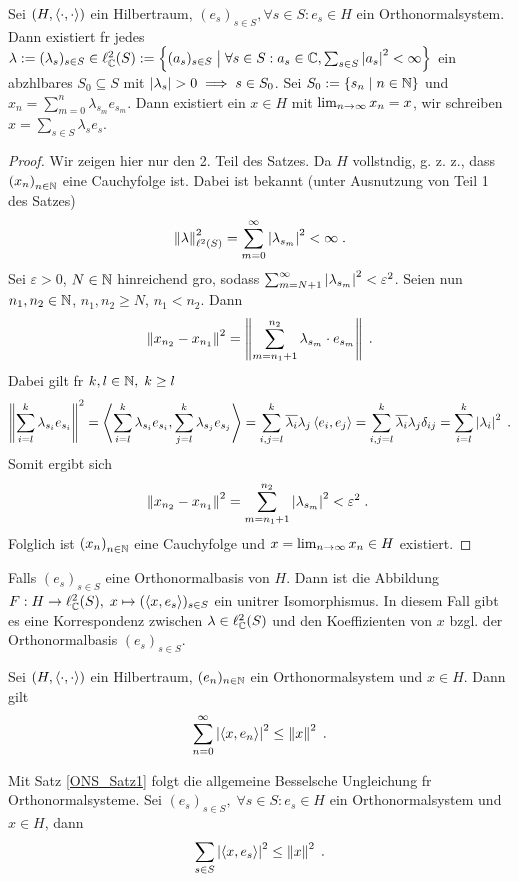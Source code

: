 \begin{theorem}
	Sei \((H, \ip{\cdot, \cdot})\) ein Hilbertraum, \((e_s)_{s\in S}, \forall s\in S: e_s \in H\) ein Orthonormalsystem. Dann existiert f\us r jedes \(\lambda := (\lambda_s)_{s\in S} \in \ell_\C^2(S) :=\set{(a_s)_{s\in S} \;\big\vert\; \forall s \in S: a_s \in \C, \sum_{s\in S} \ab{a_s}^2 < \infty}\) ein abz\as hlbares \(S_0 \subseteq S\) mit \(\ab{\lambda_s} > 0\implies s \in S_0\). Sei \(S_0 := \{s_n \;\vert\; n \in \N\}\) und \(x_n = \sum_{m=0}^n \lambda_{s_m} e_{s_m}\). Dann existiert ein \(x\in H\) mit \(\li xn = x\), wir schreiben \(x = \sum_{s\in S} \lambda_s e_s\).
	\label{ONS_Satz1}
\end{theorem}
\begin{proof}
	Wir zeigen hier nur den 2. Teil des Satzes. Da $H$ vollst\as ndig, g. z. z., dass \(\seq xn\) eine Cauchyfolge ist. Dabei ist bekannt (unter Ausnutzung von Teil 1 des Satzes)
	\[\normn{\lambda}{\ell^2(S)}^2 = \sum_{m= 0}^\infty \ab{\lambda_{s_m}}^2 < \infty\;. \]
	Sei \(\varepsilon > 0\), \(N \in \N\) hinreichend gro\s{}, sodass \(\sum_{m=N+1}^\infty \ab{\lambda_{s_m}}^2 < \varepsilon^2\). Seien nun \(n_1, n_2 \in \N\), \(n_1, n_2 \geq N\), \(n_1< n_2\). Dann
	\[\norm{x_{n_2} - x_{n_1}}^2 = \norm{\sum_{m=n_1+1}^{n_2} \lambda_{s_m}\cdot e_{s_m}}\;.\]
	Dabei gilt f\us r \(k, l\in \N, \; k \geq l\)
	\[\norm{\sum_{i=l}^k \lambda_{s_i} e_{s_i}}^2= \ip{\sum_{i=l}^k \lambda_{s_i} e_{s_i}, \sum_{j=l}^k \lambda_{s_j} e_{s_j}} = \sum_{i,j=l}^k \overline{\lambda_i}\lambda_j \ip{e_i, e_j} = \sum_{i,j=l}^k \overline{\lambda_i}\lambda_j  \delta_{ij} = \sum_{i=l}^k \ab{\lambda_i}^2\;.\]
	Somit  ergibt sich 
	\[\norm{x_{n_2} - x_{n_1}}^2 = \sum_{m=n_1+1}^{n_2} \ab{\lambda_{s_m}}^2 < \varepsilon^2 \;.\ \]
	Folglich ist \(\seq xn\) eine Cauchyfolge und \(x = \li xn \in H\) existiert.
\end{proof}
\begin{rem}[Motivation]
	Falls \((e_s)_{s\in S}\) eine Orthonormalbasis von $H$. Dann ist die Abbildung \(F:H \to \ell^2_\C(S), \; x \mapsto (\ip{x, e_s})_{s\in S}\) ein unit\as rer Isomorphismus. In diesem Fall gibt es eine Korrespondenz zwischen \(\lambda \in \ell^2_\C(S)\) und den Koeffizienten von $x$ bzgl. der Orthonormalbasis \((e_s)_{s\in S}\). 
\end{rem}

\begin{lemma}
	Sei \((H,\ip{\cdot, \cdot})\) ein Hilbertraum, \((e_n)_{n\in\N}\) ein Orthonormalsystem und \(x\in H\). Dann gilt
	\[\ser{\ab{\ip{x, e_n}}}{n}^2 \leq \norm{x}^2\;.\]
	\label{Bessel_Ungleichung}
\end{lemma}
\begin{rem}
	Mit Satz \ref{ONS_Satz1} folgt die allgemeine Besselsche Ungleichung f\us r Orthonormalsysteme. Sei \((e_s)_{s\in S}, \;\forall s \in S: e_s \in H\) ein Orthonormalsystem und \(x\in H\), dann 
	\[\sum_{s\in S} \ab{\ip{x, e_s}}^2 \leq \norm{x}^2\;.\]
\end{rem}

